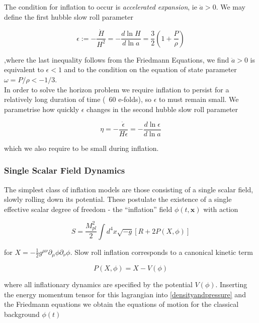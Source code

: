 \documentclass[a4paper,10pt]{article}
\renewcommand{\v}[1]{\mathbf{#1}}
\newcommand{\Mp}{M_{pl}}
\newcommand{\half}{\frac{1}{2}}
\begin{document}
The condition for inflation to occur is \textit{accelerated expansion}, ie $\ddot{a} >0$. We may define the first hubble slow roll parameter 

\begin{equation}
\label{epsilon}
\epsilon := -\frac{\dot{H}}{H^2} = -\frac{d\ln{H}}{d\ln{a}} = \frac{3}{2}(1+\frac{P}{\rho})
\end{equation}

,where the last inequality follows from the Friedmann Equations, we find $\ddot{a} >0$ is equivalent to $\epsilon<1$ and to the condition on the equation of state parameter $\omega=P/\rho < -1/3$.\\ 

In order to solve the horizon problem we require inflation to persist for a relatively long duration of time (~60 e-folds), so $\epsilon$ to must remain small. We parametrise how quickly $\epsilon$ changes in the second hubble slow roll parameter 

\begin{equation}
\eta = -\frac{\dot{\epsilon}}{H\epsilon} = -\frac{d\ln{\epsilon}}{d\ln{a}}
\end{equation}

which we also require to be small during inflation.

\subsubsection{Single Scalar Field Dynamics}

The simplest class of inflation models are those consisting of a single scalar field, slowly rolling down its potential. These postulate the existence of a single effective scalar degree of freedom - the ``inflation'' field $\phi(t,\v{x})$ with action


\begin{equation}
S = \frac{\Mp^2}{2} \int d^4x \sqrt{-g}[R+2P(X,\phi)] 
\label{inflationaction}
\end{equation}

for $X=-\half g^{\mu\nu}\partial_\mu\phi\partial_\nu\phi$. Slow roll inflation corresponds to a canonical kinetic term 

\begin{equation}
P(X,\phi) = X - V(\phi)
\end{equation}

where all inflationary dynamics are specified by the potential $V(\phi)$. Inserting the energy momentum tensor for this lagrangian into \ref{densityandpressure} and the Friedmann equations we obtain the equations of motion for the classical background $\phi(t)$
\end{document}
